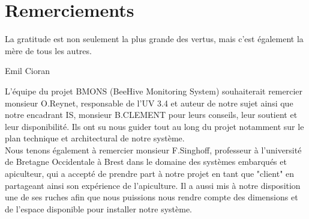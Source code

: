 \chapter{Remerciements}
\epigraph{La gratitude est non seulement la plus grande des vertus, mais c'est également la mère de tous les autres.}{Emil Cioran}

L'équipe du projet BMONS (BeeHive Monitoring System) souhaiterait remercier monsieur O.Reynet, responsable de l'UV 3.4 et auteur de notre sujet ainsi que notre encadrant IS, monsieur B.CLEMENT pour leurs conseils, leur soutient et leur disponibilité. Ils ont su nous guider tout au long du projet notamment sur le plan technique et architectural de notre système. \\

Nous tenons également à remercier monsieur F.Singhoff, professeur à l'université de Bretagne Occidentale à Brest dans le domaine des systèmes embarqués et apiculteur, qui a accepté de prendre part à notre projet en tant que "client" en partageant ainsi son expérience de l'apiculture. Il a aussi mis à notre disposition une de ses ruches afin que nous puissions nous rendre compte des dimensions et de l'espace disponible pour installer notre système.
       
 
